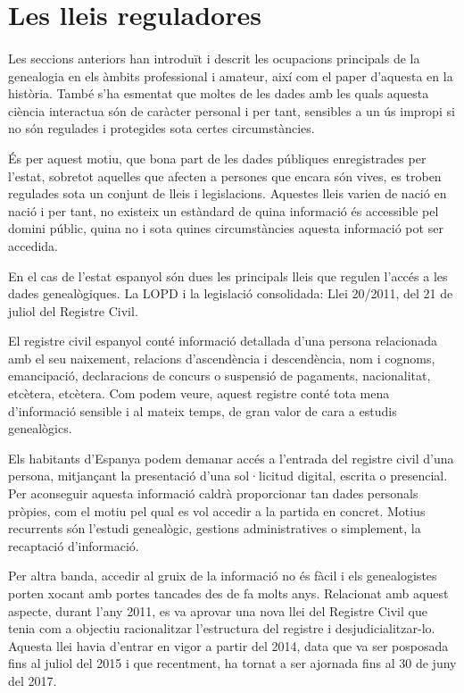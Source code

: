 \section{Les lleis reguladores}

    \paragraph{}
    Les seccions anteriors han introduït i descrit les ocupacions principals de la genealogia en els àmbits professional i amateur, així com el paper d'aquesta en la història. També s'ha esmentat que moltes de les dades amb les quals aquesta ciència interactua són de caràcter personal i per tant, sensibles a un ús impropi si no són regulades i protegides sota certes circumstàncies.

    És per aquest motiu, que bona part de les dades públiques enregistrades per l’estat, sobretot aquelles que afecten a persones que encara són vives, es troben regulades sota un conjunt de lleis i legislacions. Aquestes lleis varien de nació en nació i per tant, no existeix un estàndard de quina informació és accessible pel domini públic, quina no i sota quines circumstàncies aquesta informació pot ser accedida.

    En el cas de l’estat espanyol són dues les principals lleis que regulen l’accés a les dades genealògiques. La \gls{LOPD} i la legislació consolidada: Llei 20/2011, del 21 de juliol del Registre Civil.

    El registre civil espanyol conté informació detallada d'una persona relacionada amb el seu naixement, relacions d’ascendència i descendència, nom i cognoms, emancipació, declaracions de concurs o suspensió de pagaments, nacionalitat, etcètera, etcètera.  Com podem veure, aquest registre conté tota mena d’informació sensible i al mateix temps, de gran valor de cara a estudis genealògics.

    Els habitants d'Espanya podem demanar accés a l'entrada del registre civil d'una persona, mitjançant la presentació d'una sol·licitud digital, escrita o presencial. Per aconseguir aquesta informació caldrà proporcionar tan dades personals pròpies, com el motiu pel qual es vol accedir a la partida en concret. Motius recurrents són l'estudi genealògic, gestions administratives o simplement, la recaptació d'informació.

    Per altra banda, accedir al gruix de la informació no és fàcil i els genealogistes porten xocant amb portes tancades des de fa molts anys. Relacionat amb aquest aspecte, durant l'any 2011, es va aprovar una nova llei del Registre Civil que tenia com a objectiu racionalitzar l'estructura del registre i desjudicialitzar-lo. Aquesta llei havia d'entrar en vigor a partir del 2014, data que va ser posposada fins al juliol del 2015 i que recentment, ha tornat a ser ajornada fins al 30 de juny del 2017.

